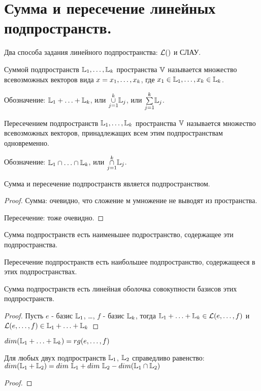 \section{Сумма и пересечение линейных подпространств.}
Два способа задания линейного подпространства: $\lo$ и СЛАУ.
\begin{opred}
Суммой подпространств $\mathbb{L}_1,\ldots,\mathbb{L}_k$ пространства $\mathbb{V}$ называется множество всевозможных векторов вида $x=x_1,\ldots,x_k$, где $x_1\in \mathbb{L}_1,\ldots,x_k\in \mathbb{L}_k$. 

Обозначение: $\mathbb{L}_1+\ldots+\mathbb{L}_k$, или $\underset{j=1}{\overset{k}{\cup}}\mathbb{L}_j$, или $\underset{j=1}{\overset{k}{\sum}}\mathbb{L}_j$.
\end{opred}
\begin{opred}
Пересечением подпространств $\mathbb{L}_1,\ldots,\mathbb{L}_k$ пространства $\mathbb{V}$ называется множество всевозможных векторов, принадлежащих всем этим подпространствам одновременно.

Обозначение: $\mathbb{L}_1\cap\ldots\cap\mathbb{L}_k$, или $\underset{j=1}{\overset{k}{\cap}}\mathbb{L}_j$.
\end{opred}
\begin{theor}
Сумма и пересечение подпространств является подпространством.
\end{theor}
\begin{proof}
Сумма: очевидно, что сложение м умножение не выводят из пространства.

Пересечение: тоже очевидно.
\end{proof}
\begin{remark}
Сумма подпространств есть наименьшее подространство, содержащее эти подпространства.

Пересечение подпространств есть наибольшее подпространство, содержащееся в этих подпространствах.
\end{remark}
\begin{theor}
Сумма подпространств есть линейная оболочка совокупности базисов этих подпространств.
\end{theor}
\begin{proof}
Пусть $e$ - базис $\mathbb{L}_1$, \ldots, $f$ - базис $\mathbb{L}_k$, тогда $\mathbb{L}_1+\ldots+\mathbb{L}_k\in\mathcal{L}(e,\ldots,f)$ и $\mathcal{L}(e,\ldots,f)\in\mathbb{L}_1+\ldots+\mathbb{L}_k$
\end{proof}
\begin{effect}
$dim(\mathbb{L}_1+\ldots+\mathbb{L}_k)=rg(e,\ldots,f)$
\end{effect}
\begin{theor}
Для любых двух подпространств $\mathbb{L}_1$, $\mathbb{L}_2$ справедливо равенство: $dim(\L_1+\L_2)=dim\ \L_1+dim\ \L_2-dim(\L_1\cap\L_2)$
\end{theor}
\begin{proof}
\end{proof}
